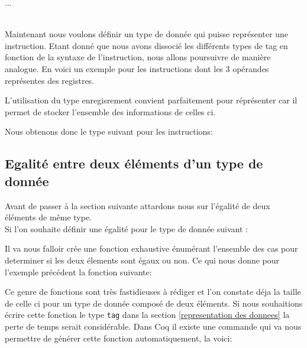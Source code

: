 \documentclass {article}
\newcommand{\codefrom}[3]
           {}
\theoremstyle{definition}
\theoremstyle{remark}
\newcommand{\fun}[1]{\lstinline!#1!}
\begin{document}
\codefrom{src}{ast_instructions}{tag_definition}
...

\\ 

Maintenant nous voulons définir un type de donnée qui puisse représenter une instruction.
Etant donné que nous avons dissocié les différents types de tag en fonction de la syntaxe de l'instruction,
nous allons poursuivre de manière analogue.
En voici un exemple pour les instructions dont les 3 opérandes représentes des registres.

\codefrom{src}{ast_instructions}{instruction_tern_n}

L'utilisation du type enregisrement convient parfaitement pour réprésenter car il permet de stocker
l'ensemble des informations de celles ci.

Nous obtenons donc le type suivant pour les instructions:
\codefrom{src}{ast_instructions}{instruction}




\subsection{Egalité entre deux éléments d'un type de donnée}
Avant de passer à la section suivante attardons nous sur l'égalité de deux éléments de même type.
\\
Si l'on souhaite définir une égalité pour le type de donnée suivant :
\codefrom{rapport}{definitions}{example_type}

Il va nous falloir crée une fonction exhaustive énumérant l'ensemble des cas pour determiner
si les deux élements sont égaux ou non. Ce qui nous donne pour l'exemple précédent la fonction suivante:

\codefrom{rapport}{definitions}{equal}

Ce genre de fonctions sont très fastidieuses à rédiger et l'on constate déja la taille de celle ci
pour un type de donnée composé de deux éléments.
Si nous souhaitions écrire cette fonction le type \fun{tag} dans
la section \ref{representation des donnees} la perte de temps serait considérable.
Dans Coq il existe une commande qui va nous permettre de générer cette fonction
automatiquement, la voici:
\end{document}
